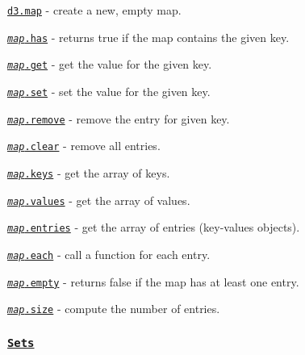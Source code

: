 \begin{DoxyItemize}
\item \href{https://github.com/d3/d3-collection/blob/master/README.md#map}{\tt d3.\+map} -\/ create a new, empty map.
\item \href{https://github.com/d3/d3-collection/blob/master/README.md#map_has}{\tt {\itshape map}.has} -\/ returns true if the map contains the given key.
\item \href{https://github.com/d3/d3-collection/blob/master/README.md#map_get}{\tt {\itshape map}.get} -\/ get the value for the given key.
\item \href{https://github.com/d3/d3-collection/blob/master/README.md#map_set}{\tt {\itshape map}.set} -\/ set the value for the given key.
\item \href{https://github.com/d3/d3-collection/blob/master/README.md#map_remove}{\tt {\itshape map}.remove} -\/ remove the entry for given key.
\item \href{https://github.com/d3/d3-collection/blob/master/README.md#map_clear}{\tt {\itshape map}.clear} -\/ remove all entries.
\item \href{https://github.com/d3/d3-collection/blob/master/README.md#map_keys}{\tt {\itshape map}.keys} -\/ get the array of keys.
\item \href{https://github.com/d3/d3-collection/blob/master/README.md#map_values}{\tt {\itshape map}.values} -\/ get the array of values.
\item \href{https://github.com/d3/d3-collection/blob/master/README.md#map_entries}{\tt {\itshape map}.entries} -\/ get the array of entries (key-\/values objects).
\item \href{https://github.com/d3/d3-collection/blob/master/README.md#map_each}{\tt {\itshape map}.each} -\/ call a function for each entry.
\item \href{https://github.com/d3/d3-collection/blob/master/README.md#map_empty}{\tt {\itshape map}.empty} -\/ returns false if the map has at least one entry.
\item \href{https://github.com/d3/d3-collection/blob/master/README.md#map_size}{\tt {\itshape map}.size} -\/ compute the number of entries.
\end{DoxyItemize}

\subsubsection*{\href{https://github.com/d3/d3-collection/blob/master/README.md#sets}{\tt Sets}}

